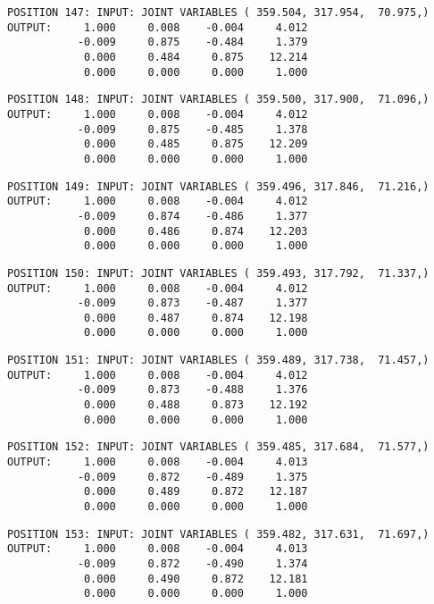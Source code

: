 \begin{verbatim}
POSITION 147: INPUT: JOINT VARIABLES ( 359.504, 317.954,  70.975,)
OUTPUT:     1.000     0.008    -0.004     4.012
           -0.009     0.875    -0.484     1.379
            0.000     0.484     0.875    12.214
            0.000     0.000     0.000     1.000
\end{verbatim} \pagebreak[1]\begin{verbatim}
POSITION 148: INPUT: JOINT VARIABLES ( 359.500, 317.900,  71.096,)
OUTPUT:     1.000     0.008    -0.004     4.012
           -0.009     0.875    -0.485     1.378
            0.000     0.485     0.875    12.209
            0.000     0.000     0.000     1.000
\end{verbatim} \pagebreak[1]\begin{verbatim}
POSITION 149: INPUT: JOINT VARIABLES ( 359.496, 317.846,  71.216,)
OUTPUT:     1.000     0.008    -0.004     4.012
           -0.009     0.874    -0.486     1.377
            0.000     0.486     0.874    12.203
            0.000     0.000     0.000     1.000
\end{verbatim} \pagebreak[1]\begin{verbatim}
POSITION 150: INPUT: JOINT VARIABLES ( 359.493, 317.792,  71.337,)
OUTPUT:     1.000     0.008    -0.004     4.012
           -0.009     0.873    -0.487     1.377
            0.000     0.487     0.874    12.198
            0.000     0.000     0.000     1.000
\end{verbatim} \pagebreak[1]\begin{verbatim}
POSITION 151: INPUT: JOINT VARIABLES ( 359.489, 317.738,  71.457,)
OUTPUT:     1.000     0.008    -0.004     4.012
           -0.009     0.873    -0.488     1.376
            0.000     0.488     0.873    12.192
            0.000     0.000     0.000     1.000
\end{verbatim} \pagebreak[1]\begin{verbatim}
POSITION 152: INPUT: JOINT VARIABLES ( 359.485, 317.684,  71.577,)
OUTPUT:     1.000     0.008    -0.004     4.013
           -0.009     0.872    -0.489     1.375
            0.000     0.489     0.872    12.187
            0.000     0.000     0.000     1.000
\end{verbatim} \pagebreak[1]\begin{verbatim}
POSITION 153: INPUT: JOINT VARIABLES ( 359.482, 317.631,  71.697,)
OUTPUT:     1.000     0.008    -0.004     4.013
           -0.009     0.872    -0.490     1.374
            0.000     0.490     0.872    12.181
            0.000     0.000     0.000     1.000
\end{verbatim} \pagebreak[1]\begin{verbatim}

\end{verbatim}
